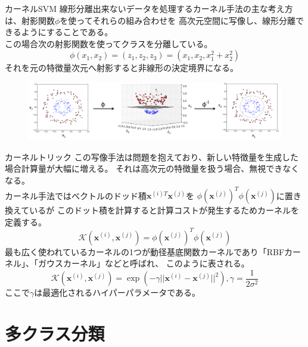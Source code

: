 \documentclass[aspectratio=169, dvipdfmx, 11pt]{beamer} %
\begin{document}
\begin{frame}{カーネルSVM}
    線形分離出来ないデータを処理するカーネル手法の主な考え方は、射影関数\(\phi\)を使ってそれらの組み合わせを
    高次元空間に写像し、線形分離できるようにすることである。\\
    この場合次の射影関数を使ってクラスを分離している。
    \begin{equation*}
        \phi(x_1, x_2) = (z_1, z_2, z_3) = (x_1, x_2, x_{1}^{2}+x_{2}^{2})
    \end{equation*}
    それを元の特徴量次元へ射影すると非線形の決定境界になる。
    \begin{figure}[b]
        \begin{center}
        \includegraphics[width=150mm]{img/day02/fig08.png}
        \end{center}
    \end{figure}
\end{frame}

\begin{frame}{カーネルトリック}
    この写像手法は問題を抱えており、新しい特徴量を生成した場合計算量が大幅に増える。
    それは高次元の特徴量を扱う場合、無視できなくなる。\\
    カーネル手法ではベクトルのドッド積\(\textbf{x}^{(i)T}\textbf{x}^{(j)}\)を
    \(\phi(\textbf{x}^{(j)})^T \phi(\textbf{x}^{(j)})\)に置き換えているが
    このドット積を計算すると計算コストが発生するためカーネルを定義する。
    \begin{equation*}
        \mathcal{K} (\textbf{x}^{(i)}, \textbf{x}^{(j)}) = \phi(\textbf{x}^{(j)})^T \phi(\textbf{x}^{(j)})
    \end{equation*}
    最も広く使われているカーネルの1つが動径基底関数カーネルであり「RBFカーネル」、「ガウスカーネル」などと呼ばれ、
    このように表される。
    \begin{equation*}
        \mathcal{K} (\textbf{x}^{(i)}, \textbf{x}^{(j)}) 
        = \exp (-\gamma ||\textbf{x}^{(i)} - \textbf{x}^{(j)}||^2), 
        \gamma = \frac{1}{2\sigma ^2}
    \end{equation*}
    ここで\(\gamma \)は最適化されるハイパーパラメータである。
\end{frame}

\section{多クラス分類}
\end{document}
